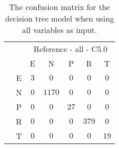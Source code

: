 \begin{table}[!ht]
	\centering
	\begin{tabular}{|c|c|c|c|c|c|c|}
		\cline{3-7}
		\multicolumn{2}{c|}{} & \multicolumn{5}{|c|}{Reference - all - C5.0} \\ \cline{3-7}
		\multicolumn{2}{c|}{} & E & N & P & R & T \\ \hline
		\multirow{5}{*}{\rotatebox{90}{Prediction}} & E & $3$ & $0$ & $0$ & $0$ & $0$ \\ \cline{2-7}
		 & N & $0$ & $1170$ & $0$ & $0$ & $0$ \\ \cline{2-7}
		 & P & $0$ & $0$ & $27$ & $0$ & $0$ \\ \cline{2-7}
		 & R & $0$ & $0$ & $0$ & $379$ & $0$ \\ \cline{2-7}
		 & T & $0$ & $0$ & $0$ & $0$ & $19$ \\ \hline
	\end{tabular}
	\caption{The confusion matrix for the decision tree model when using all variables as input.}
	\label{tab:cm:all:C5.0}
\end{table}
